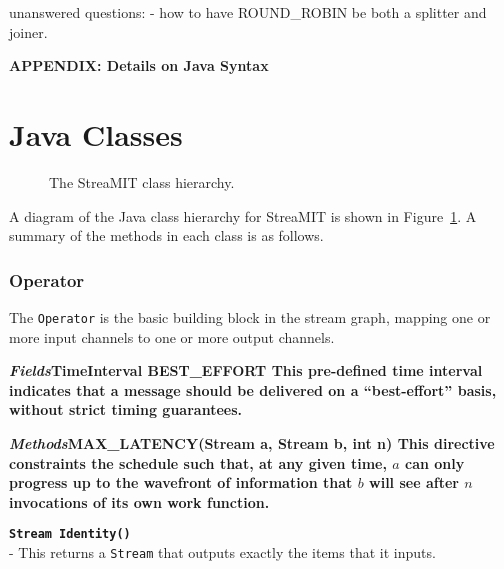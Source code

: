unanswered questions:
- how to have ROUND\_ROBIN be both a splitter and joiner.

\clearpage

\newcommand{\doc}[1]{{\bf {\tt #1}} \\ }
\newcommand{\methods}[1]{\bf {\it Methods}}
\newcommand{\fields}[1]{\bf {\it Fields}}

\renewcommand{\theequation}{A-\arabic{equation}}
\setcounter{equation}{0}  %
\setcounter{section}{0}

\begin{center}
{\bf APPENDIX:  Details on Java Syntax}
\end{center}

\section{Java Classes}

\begin{figure}
\centering
{}
\caption{\protect\small The StreaMIT class hierarchy.
\protect\label{fig:hierarchy}}
\end{figure}

A diagram of the Java class hierarchy for StreaMIT is shown in
Figure~\ref{fig:hierarchy}.  A summary of the methods in each class is
as follows.

\subsubsection{Operator}

The {\tt Operator} is the basic building block in the stream graph,
mapping one or more input channels to one or more output channels.

\fields

\doc{TimeInterval BEST\_EFFORT}  This pre-defined time interval
indicates that a message should be delivered on a ``best-effort''
basis, without strict timing guarantees.

\methods

\doc{MAX\_LATENCY(Stream a, Stream b, int n)}  This directive
constraints the schedule such that, at any given time, $a$ can only
progress up to the wavefront of information that $b$ will see after
$n$ invocations of its own work function.

\doc{Stream Identity()} - This returns a {\tt Stream} that outputs
exactly the items that it inputs.

